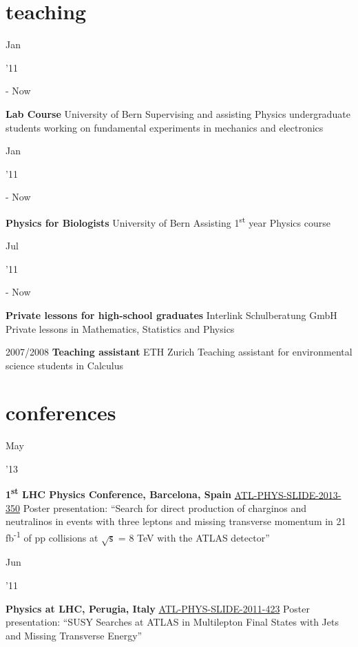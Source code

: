 \documentclass[]{cv} %
\begin{document}
\newpage

\section{teaching}

\begin{entrylist}

\entry
{\parbox[t]{\parboxWidthOne}{Jan}\parbox[t]{\parboxWidthTwo}{\hfill '11} - Now}
{\textbf{Lab Course}}
{University of Bern}
{Supervising and assisting Physics undergraduate students working on fundamental experiments in mechanics and electronics}

\entry
{\parbox[t]{\parboxWidthOne}{Jan}\parbox[t]{\parboxWidthTwo}{\hfill '11} - Now}
{\textbf{Physics for Biologists}}
{University of Bern}
{Assisting 1\textsuperscript{st} year Physics course}

\entry
{\parbox[t]{\parboxWidthOne}{Jul}\parbox[t]{\parboxWidthTwo}{\hfill '11} - Now}
{\textbf{Private lessons for high-school graduates}}
{Interlink Schulberatung GmbH}
{Private lessons in Mathematics, Statistics and Physics}

\entry
{2007/2008}
{\textbf{Teaching assistant}}
{ETH Zurich}
{Teaching assistant for environmental science students in Calculus}

\end{entrylist}

\section{conferences}

\begin{entrylist}

  \entry
  {\parbox[t]{\parboxWidthOne}{May}\parbox[t]{\parboxWidthTwo}{\hfill '13}}
  {\textbf{1\textsuperscript{st} LHC Physics Conference, Barcelona, Spain}}
  {\href{https://cds.cern.ch/record/1555743}{ATL-PHYS-SLIDE-2013-350}}
  {Poster presentation: ``Search for direct production of charginos and neutralinos in events with three
    leptons and missing transverse momentum in 21 fb\textsuperscript{-1} of pp collisions at $\sqrt{\mathsf{s}}$ = 8 TeV with the ATLAS
detector''}

  \entry
  {\parbox[t]{\parboxWidthOne}{Jun}\parbox[t]{\parboxWidthTwo}{\hfill '11}}
  {\textbf{Physics at LHC, Perugia, Italy}}
  {\href{https://cds.cern.ch/record/1371922}{ATL-PHYS-SLIDE-2011-423}}
  {Poster presentation: ``SUSY Searches at ATLAS in Multilepton Final States with Jets and Missing Transverse Energy''}

\end{entrylist}
\end{document}
